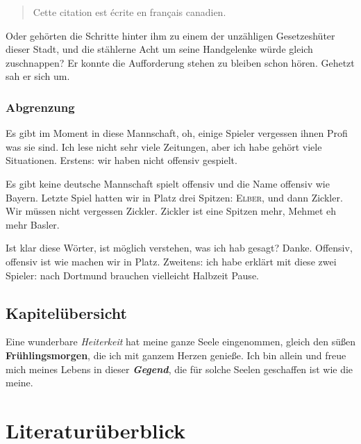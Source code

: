 \begin{french}

\begin{quote}
Cette citation est écrite en français canadien.
\end{quote}

\end{french}

Oder gehörten die Schritte hinter ihm zu einem der unzähligen
Gesetzeshüter dieser Stadt, und die stählerne Acht um seine
Handgelenke würde gleich zuschnappen? Er konnte die Aufforderung
stehen zu bleiben schon hören. Gehetzt sah er sich um.

\hypertarget{abgrenzung}{%
\subsubsection{Abgrenzung}\label{abgrenzung}}

Es gibt im Moment in diese Mannschaft, oh, einige Spieler vergessen
ihnen Profi was sie sind. Ich lese nicht sehr viele Zeitungen, aber
ich habe gehört viele Situationen. Erstens: wir haben nicht offensiv
gespielt.

Es gibt keine deutsche Mannschaft spielt offensiv und die Name
offensiv wie Bayern. Letzte Spiel hatten wir in Platz drei Spitzen:
\textsc{Elber},  und dann Zickler. Wir müssen
nicht vergessen Zickler. Zickler ist eine Spitzen mehr, Mehmet eh
mehr Basler.

Ist klar diese Wörter, ist möglich verstehen, was ich hab gesagt?
Danke. Offensiv, offensiv ist wie machen wir in Platz. Zweitens: ich
habe erklärt mit diese zwei Spieler: nach Dortmund brauchen
vielleicht Halbzeit Pause.

\hypertarget{kapiteluxfcbersicht}{%
\subsection{Kapitelübersicht}\label{kapiteluxfcbersicht}}

Eine wunderbare \emph{Heiterkeit} hat meine ganze Seele eingenommen,
gleich den süßen \textbf{Frühlingsmorgen}, die ich mit ganzem Herzen
genieße. Ich bin allein und freue mich meines Lebens in dieser
\emph{\textbf{Gegend}}, die für solche Seelen geschaffen ist wie die
meine.

\hypertarget{literaturuxfcberblick}{%
\section{Literaturüberblick}\label{literaturuxfcberblick}}

